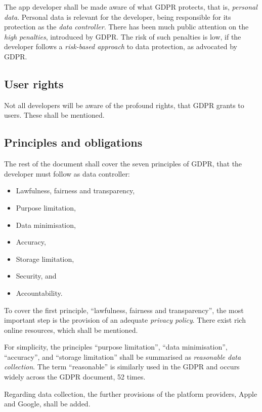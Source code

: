\documentclass[
]{book}
\providecommand{\tightlist}{%
  \setlength{\itemsep}{0pt}\setlength{\parskip}{0pt}}
\begin{document}
The app developer shall be made aware of what GDPR protects, that is, \emph{personal data}. Personal data is relevant for the developer, being responsible for its protection as the \emph{data controller}. There has been much public attention on the \emph{high penalties}, introduced by GDPR. The risk of such penalties is low, if the developer follows a \emph{risk-based approach} to data protection, as advocated by GDPR.

\hypertarget{user-rights}{%
\subsection{User rights}\label{user-rights}}

Not all developers will be aware of the profound rights, that GDPR grants to users. These shall be mentioned.

\hypertarget{principles-and-obligations}{%
\subsection{Principles and obligations}\label{principles-and-obligations}}

The rest of the document shall cover the seven principles of GDPR, that the developer must follow as data controller:

\begin{itemize}
\tightlist
\item
  Lawfulness, fairness and transparency,
\item
  Purpose limitation,
\item
  Data minimisation,
\item
  Accuracy,
\item
  Storage limitation,
\item
  Security, and
\item
  Accountability.
\end{itemize}

To cover the first principle, ``lawfulness, fairness and transparency'', the most important step is the provision of an adequate \emph{privacy policy}. There exist rich online resources, which shall be mentioned.

For simplicity, the principles ``purpose limitation'', ``data minimisation'', ``accuracy'', and ``storage limitation'' shall be summarised as \emph{reasonable data collection}. The term ``reasonable'' is similarly used in the GDPR and occurs widely across the GDPR document, 52 times.

Regarding data collection, the further provisions of the platform providers, Apple and Google, shall be added.
\end{document}
